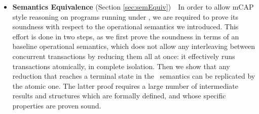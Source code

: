 \begin{itemize}
	\item \textbf{Semantics Equivalence} (Section \ref{sec:semEquiv})\ \ In order to allow mCAP style reasoning on programs running under \tpl, we are required to prove its soundness with respect to the operational semantics we introduced. This effort is done in two steps, as we first prove the soundness in terms of an baseline operational semantics, which does not allow any interleaving between concurrent transactions by reducing them all at once: it effectively runs transactions atomically, in complete isolation. Then we show that any reduction that reaches a terminal state in the \tpl\ semantics can be replicated by the atomic one. The latter proof requires a large number of intermediate results and structures which are formally defined, and whose specific properties are proven sound.
\end{itemize}